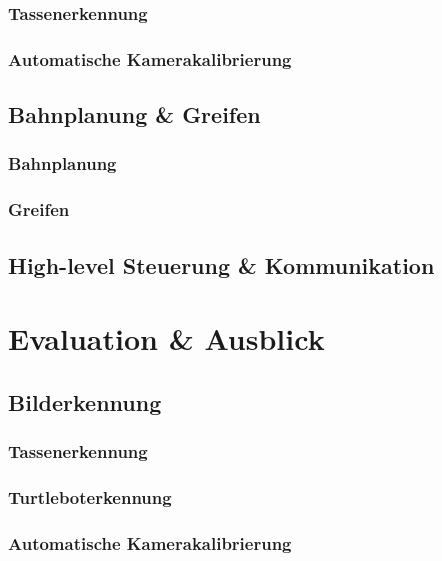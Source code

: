 \documentclass[de,ids]{fziartcl}
\begin{document}
\subsubsection{Tassenerkennung}
\subsubsection{Automatische Kamerakalibrierung}
\subsection{Bahnplanung \& Greifen}
\subsubsection{Bahnplanung}
\subsubsection{Greifen}
\subsection{High-level Steuerung \& Kommunikation}

\section{Evaluation \& Ausblick} %
\subsection{Bilderkennung}
\subsubsection{Tassenerkennung}
\subsubsection{Turtleboterkennung}
\subsubsection{Automatische Kamerakalibrierung}
\end{document}
